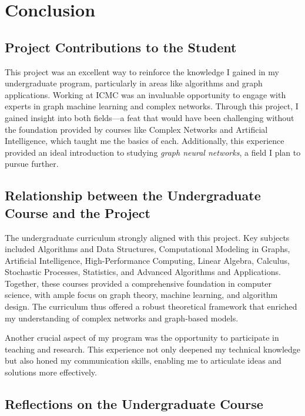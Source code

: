 \chapter{Conclusion}
\label{Conclusion}

\section{Project Contributions to the Student}

This project was an excellent way to reinforce the knowledge I gained in my undergraduate program, particularly in areas like algorithms and graph applications. Working at ICMC was an invaluable opportunity to engage with experts in graph machine learning and complex networks. Through this project, I gained insight into both fields—a feat that would have been challenging without the foundation provided by courses like Complex Networks and Artificial Intelligence, which taught me the basics of each. Additionally, this experience provided an ideal introduction to studying \emph{graph neural networks}, a field I plan to pursue further.

\section{Relationship between the Undergraduate Course and the Project}

The undergraduate curriculum strongly aligned with this project. Key subjects included Algorithms and Data Structures, Computational Modeling in Graphs, Artificial Intelligence, High-Performance Computing, Linear Algebra, Calculus, Stochastic Processes, Statistics, and Advanced Algorithms and Applications. Together, these courses provided a comprehensive foundation in computer science, with ample focus on graph theory, machine learning, and algorithm design. The curriculum thus offered a robust theoretical framework that enriched my understanding of complex networks and graph-based models.

Another crucial aspect of my program was the opportunity to participate in teaching and research. This experience not only deepened my technical knowledge but also honed my communication skills, enabling me to articulate ideas and solutions more effectively.

\section{Reflections on the Undergraduate Course}

